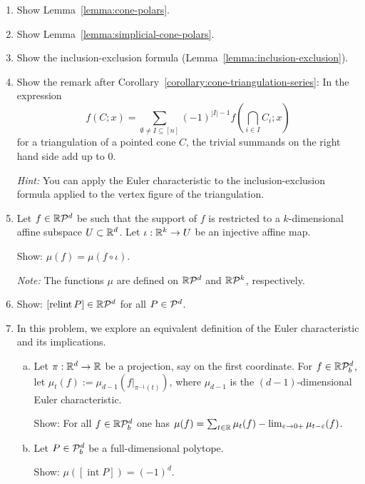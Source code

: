 \begin{enumerate}
  \item Show Lemma~\ref{lemma:cone-polars}.

  \item Show Lemma~\ref{lemma:simplicial-cone-polars}.

  \item Show the inclusion-exclusion formula (Lemma~\ref{lemma:inclusion-exclusion}).

  \item Show the remark after Corollary~\ref{corollary:cone-triangulation-series}:
    In the expression
    \[
      f(C;x) = \sum_{\emptyset \neq I \subseteq [n]} (-1)^{|I| - 1} f(\bigcap_{i \in I} C_i; x)
    \]
    for a triangulation of a pointed cone $C$,
    the trivial summands on the right hand side add up to $0$.

    \emph{Hint:} You can apply the Euler characteristic to the inclusion-exclusion formula applied to the vertex figure of the triangulation.

  \item Let $f \in \mathbb{R}\mathcal{P}^d$ be such that the support of $f$ is restricted to a $k$-dimensional affine subspace $U \subset \mathbb{R}^d$.
    Let $\iota : \mathbb{R}^k \to U$ be an injective affine map.

    Show: $\mu(f) = \mu(f \circ \iota)$.

    \emph{Note:} The functions $\mu$ are defined on $\mathbb{R}\mathcal{P}^d$ and $\mathbb{R}\mathcal{P}^k$, respectively.

  \item Show: $[\operatorname{relint} P] \in \mathbb{R}\mathcal{P}^d$ for all $P \in \mathcal{P}^d$.

  \item In this problem, we explore an equivalent definition of the Euler characteristic
    and its implications.
    \begin{enumerate}[(a)]
      \item Let $\pi : \mathbb{R}^d \to \mathbb{R}$ be a projection, say on the first coordinate.
        For $f \in \mathbb{R}\mathcal{P}_b^d$, let $\mu_t(f) := \mu_{d-1}(f|_{\pi^{-1}(t)})$, where $\mu_{d-1}$ is the $(d-1)$-dimensional Euler characteristic.

        Show: For all $f \in \mathbb{R}\mathcal{P}_b^d$ one has $\mu(f) = \sum_{t \in \mathbb{R}} \mu_t(f) - \lim_{\varepsilon \to 0+} \mu_{t-\varepsilon}(f)$.

      \item Let $P \in \mathcal{P}_b^d$ be a full-dimensional polytope.

        Show: $\mu([\operatorname{int} P]) = (-1)^d$.


\end{enumerate}
\end{enumerate}

